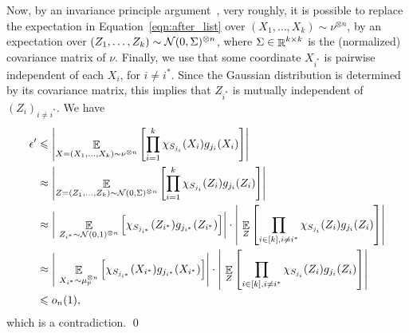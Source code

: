 Now, by an invariance principle argument~\cite{MOO10, Mos10, Mos20}, very roughly, it is possible to replace the expectation in Equation~\ref{eqn:after_list} over $(X_1,\dots,X_k)\sim \nu^{\otimes n}$, by an expectation over $(Z_1,\dots,Z_k) \sim \mathcal N(0,\Sigma)^{\otimes n}$, where $\Sigma\in \mathop{\mathbb{R}}^{k\times k}$ is the (normalized) covariance matrix of $\nu$.
Finally, we use that some coordinate $X_{i^*}$ is pairwise independent of each $X_i$, for $i\not=i^*$.
Since the Gaussian distribution is determined by its covariance matrix, this implies that $Z_{i^*}$ is mutually independent of $(Z_i)_{i\not=i^*}$.
We have
\begin{align*}
	\epsilon' &\leqslant \left|\mathop{\mathbb{E}}_{X=(X_1,\dots,X_k)\sim \nu^{\otimes n}} \left[ \prod_{i=1}^k \chi_{S_{j_i}}(X_i) g_{j_i}(X_i)  \right] \right|
	\\ &\approx  \left|\mathop{\mathbb{E}}_{Z=(Z_1,\dots,Z_k)\sim \mathcal N(0,\Sigma)^{\otimes n}} \left[ \prod_{i=1}^k \chi_{S_{j_i}}(Z_i) g_{j_i}(Z_i)  \right] \right|
	\\&\approx \left|\ \mathop{\mathbb{E}}_{Z_{i^*}\sim \mathcal N(0,1)^{\otimes n}} \left[  \chi_{S_{j_{i^*}}}(Z_{i^*}) g_{j_{i^*}}(Z_{i^*}) \right] \right|\cdot  \left|\ \mathop{\mathbb{E}}_{Z} \left[ \prod_{i\in [k], i\not=i^*} \chi_{S_{j_i}}(Z_i) g_{j_i}(Z_i)  \right] \right|
	\\&\approx \left|\ \mathop{\mathbb{E}}_{X_{i^*}\sim \mu_p^{\otimes n}} \left[  \chi_{S_{j_{i^*}}}(X_{i^*}) g_{j_{i^*}}(X_{i^*}) \right] \right|\cdot  \left|\ \mathop{\mathbb{E}}_{Z} \left[ \prod_{i\in [k], i\not=i^*} \chi_{S_{j_i}}(Z_i) g_{j_i}(Z_i)  \right] \right|
	\\ &\leqslant o_n(1),
\end{align*}
which is a contradiction.
\qed
